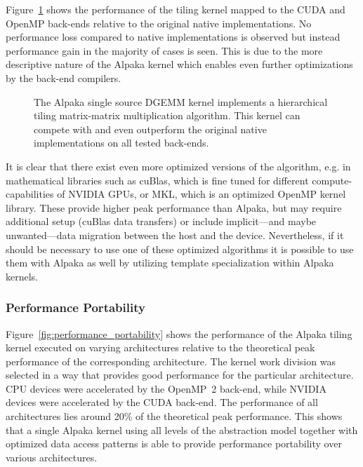 \documentclass[10pt, twocolumn]{article}
\newcommand{\alpaka}{Alpaka\xspace}
\newcommand{\cuda}{{CUDA}\xspace}
\newcommand{\openmp}{{OpenMP}\xspace}
\newcommand{\cublas}{{cuBlas}\xspace}
\newcommand{\nvidia}{{NVIDIA}\xspace}
\begin{document}
Figure~\ref{fig:relative_performance_tiling_kernel} shows the performance of the tiling kernel mapped to the \cuda and \openmp back-ends relative to the original native implementations. No performance loss compared to native implementations is observed but instead performance gain in the majority of cases is seen.
This is due to the more descriptive nature of the \alpaka kernel which enables even further optimizations by the back-end compilers.


\begin{figure}[bt]
  \centerline
      {}
      \caption{The \alpaka single source DGEMM kernel implements a hierarchical tiling matrix-matrix multiplication algorithm.
        This kernel can compete with and even outperform the original native implementations on all tested back-ends.}
  \label{fig:relative_performance_tiling_kernel}
\end{figure}

It is clear that there exist even more optimized versions of the algorithm, e.g. in mathematical libraries such as \cublas, which is fine tuned for different compute-capabilities of \nvidia GPUs, or MKL, which is an optimized \openmp kernel library.
These  provide higher peak performance than \alpaka, but may require additional setup (\cublas data transfers) or include implicit---and maybe unwanted---data migration between the host and the device.
Nevertheless, if it should be necessary to use one of these optimized algorithms it is possible to use them with \alpaka as well by utilizing template specialization within \alpaka kernels.

\hfill
\subsubsection{Performance Portability}


Figure~\ref{fig:performance_portability} shows the performance of the \alpaka tiling kernel executed on varying architectures relative to the theoretical peak performance of the corresponding architecture.
The kernel work division was selected in a way that provides good performance for the particular architecture.
CPU devices were accelerated by the \openmp~2 back-end, while NVIDIA devices were accelerated by the \cuda back-end.
The performance of all architectures lies around 20\% of the theoretical peak performance.
This shows that a single \alpaka kernel using all levels of the abstraction model together with optimized data access patterns is able to provide performance portability over various architectures.
\end{document}
